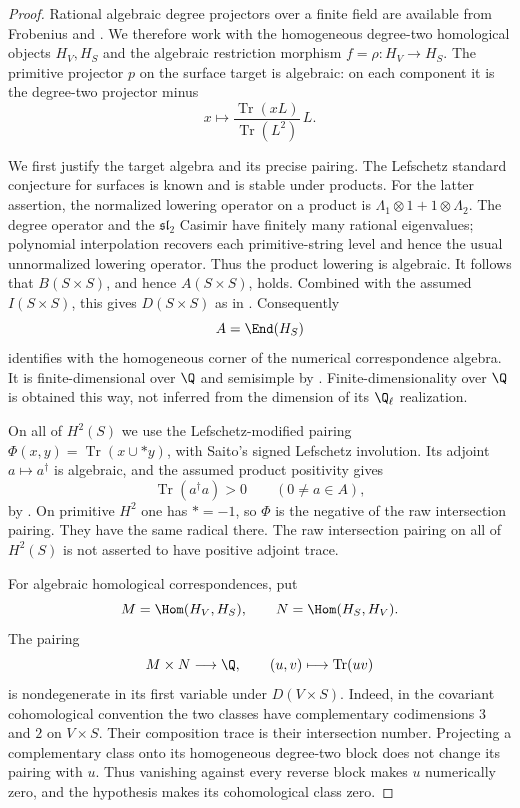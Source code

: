 \begin{proof}
Rational algebraic degree projectors over a finite field are available
from Frobenius and
\citet[Theorem~2(1), pp.~76--77]{c_katzmessing1974}.
We therefore work with the homogeneous degree-two homological
objects $H_V,H_S$ and the algebraic restriction morphism
$f=\rho:H_V\to H_S$.
The primitive projector $p$ on the surface target is algebraic:
on each component it is the degree-two projector minus
\[
 x\longmapsto
 \frac{\operatorname{Tr}(xL)}{\operatorname{Tr}(L^2)}\,L.
\]

We first justify the target algebra and its precise pairing.
The Lefschetz standard conjecture for surfaces is known and is
stable under products. For the latter assertion, the normalized
lowering operator on a product is
$\Lambda_1\otimes1+1\otimes\Lambda_2$.
The degree operator and the $\mathfrak{sl}_2$ Casimir have finitely
many rational eigenvalues; polynomial interpolation recovers
each primitive-string level and hence the usual unnormalized
lowering operator. Thus the product lowering is algebraic.
It follows that $B(S\times S)$, and hence $A(S\times S)$, holds.
Combined with the assumed $I(S\times S)$, this gives $D(S\times S)$
as in \citet[\S4.1, pp.~14--15]{c_msaito2003positivity}.
Consequently
\[
 A=\End(H_S)
\]
identifies with the homogeneous corner of the numerical
correspondence algebra. It is finite-dimensional over $\Q$ and
semisimple by \citet[Theorem~1, pp.~448--449]
{c_jannsen1992semisimple}.
Finite-dimensionality over $\Q$ is obtained this way, not inferred
from the dimension of its $\Q_\ell$ realization.

On all of $H^2(S)$ we use the Lefschetz-modified pairing
$\Phi(x,y)=\operatorname{Tr}(x\cup *y)$, with Saito's signed
Lefschetz involution. Its adjoint $a\mapsto a^\dagger$ is algebraic,
and the assumed product positivity gives
\begin{equation}
\label{eq:c-target-positive-trace}
 \operatorname{Tr}(a^\dagger a)>0\qquad(0\ne a\in A),
\end{equation}
by \citet[equation~(4.1.3), p.~15]{c_msaito2003positivity}.
On primitive $H^2$ one has $*=-1$, so $\Phi$ is the negative
of the raw intersection pairing. They have the same radical
there. The raw intersection pairing on all of $H^2(S)$ is
not asserted to have positive adjoint trace.

For algebraic homological correspondences, put
\[
 M=\Hom(H_V,H_S),\qquad N=\Hom(H_S,H_V).
\]
The pairing
\[
 M\times N\longrightarrow\Q,\qquad
 (u,v)\longmapsto\operatorname{Tr}(uv)
\]
is nondegenerate in its first variable under $D(V\times S)$.
Indeed, in the covariant cohomological convention the two
classes have complementary codimensions $3$ and $2$ on
$V\times S$. Their composition trace is their intersection
number. Projecting a complementary class onto its homogeneous
degree-two block does not change its pairing with $u$.
Thus vanishing against every reverse block makes $u$
numerically zero, and the hypothesis makes its cohomological
class zero.


\end{proof}
